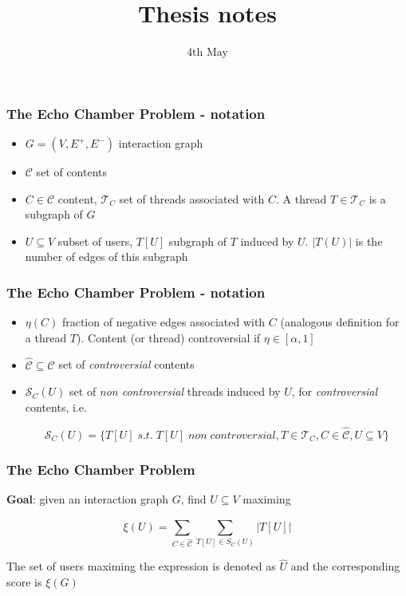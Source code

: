 \documentclass{beamer}
\title{Thesis notes}
\date{4th May}
\begin{document}
\frame{\titlepage}

\begin{frame}[c]
	\frametitle{The Echo Chamber Problem - notation}

	\begin{itemize}
		\item $G = (V, E ^{+}, E ^{-}) $ interaction graph
		\item $ \mathcal{C} $ set of contents
		\item $C \in \mathcal{C} $ content, $\mathcal{T} _{C} $ set of threads
		      associated with $C$. A thread $T \in \mathcal{T} _{C} $ is a
		      subgraph of $G$
		\item $U \subseteq V$ subset of users, $T[U]$ subgraph of $T$ induced
		      by $U$. $|T(U)|$ is the number of edges of this subgraph
	\end{itemize}
\end{frame}

\begin{frame}[c]
	\frametitle{The Echo Chamber Problem - notation}
	\begin{itemize}
		\item $\eta(C)$ fraction of negative edges associated with $C$
		      (analogous definition for a thread $T$). Content (or thread)
		      controversial if $\eta \in [\alpha, 1]$
		\item $\hat{\mathcal{C} } \subseteq \mathcal{C} $ set of \textit{controversial}
		      contents

		\item $\mathcal{S} _C (U)$ set of \textit{non controversial} threads
		      induced by $U$, for \textit{controversial} contents, i.e.

			      {\small
				      \begin{equation}
					      \mathcal{S} _{C} (U) = \{ T[U] \; s.t. \; T[U] \; non \;
					      controversial, T \in \mathcal{T} _{C}, C
					      \in \hat{\mathcal{C}}, U \subseteq V\}
				      \end{equation}
			      }
	\end{itemize}

\end{frame}

\begin{frame}[c]
	\frametitle{The Echo Chamber Problem}
	\textbf{Goal}: given an interaction graph $G$, find $U \subseteq V$ maximing

	\begin{equation}
		\xi (U) = \sum^{}_{C \in \hat{\mathcal{C}} } \sum^{}_{T[U] \in S_C (U)}
		| T[U] |
	\end{equation}

	The set of users maximing the expression is denoted as $\hat{U}$ and the
	corresponding score is $\xi(G)$
\end{frame}
\end{document}
